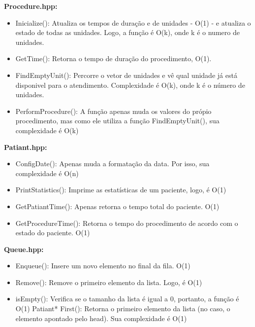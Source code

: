 \documentclass[11pt]{article}
\begin{document}
    \par\textbf{Procedure.hpp:}
    \begin{itemize}
        \item Inicialize(): Atualiza os tempos de duração e de unidades - O(1) - e atualiza o estado de todas as unidades. Logo, a função é O(k), onde k é o numero de unidades.
        \item GetTime(): Retorna o tempo de duração do procedimento, O(1).
        \item FindEmptyUnit(): Percorre o vetor de unidades e vê qual unidade já está disponivel para o atendimento. Complexidade é O(k), onde k é o número de unidades.
        \item PerformProcedure(): A função apenas muda os valores do própio procedimento, mas como ele utiliza a função FindEmptyUnit(), sua complexidade é O(k)
    \end{itemize}

    \par\textbf{Patiant.hpp:}
    \begin{itemize}
        \item ConfigDate(): Apenas muda a formatação da data. Por isso, sua complexidade é O(n)
        \item PrintStatistics(): Imprime as estatísticas de um paciente, logo, é O(1)
        \item GetPatiantTime(): Apenas retorna o tempo total do paciente. O(1)
        \item GetProcedureTime(): Retorna o tempo do procedimento de acordo com o estado do paciente. O(1)
    \end{itemize}

    \par\textbf{Queue.hpp:}
    \begin{itemize}
        \item Enqueue(): Insere um novo elemento no final da fila. O(1)
        \item Remove(): Remove o primeiro elemento da lista. Logo, é O(1)
        \item isEmpty(): Verifica se o tamanho da lista é igual a 0, portanto, a função é O(1)
        Patiant* First(): Retorna o primeiro elemento da lista (no caso, o elemento apontado pelo head). Sua complexidade é O(1)
    \end{itemize}
\end{document}

